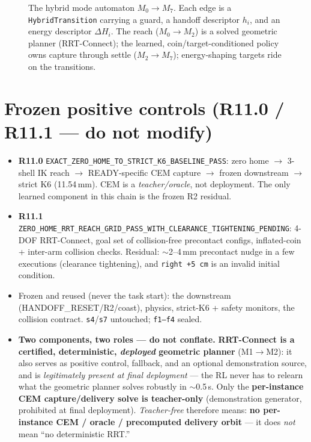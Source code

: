 \documentclass[11pt]{article}
\newcommand{\code}[1]{\texttt{\small #1}}
\begin{document}
\begin{figure}[h]\centering\caption{The hybrid mode automaton $M_0\!\to\!M_7$. Each edge is a
\code{HybridTransition} carrying a guard, a handoff descriptor $h_i$, and an energy descriptor $\Delta H_i$. The reach
($M_0\!\to\!M_2$) is a solved geometric planner (RRT-Connect); the learned, coin/target-conditioned policy owns capture
through settle ($M_2\!\to\!M_7$); energy-shaping targets ride on the transitions.}\end{figure}

\section{Frozen positive controls (R11.0 / R11.1 --- do not modify)}
\begin{itemize}[nosep,leftmargin=1.4em]
  \item \textbf{R11.0} \code{EXACT\_ZERO\_HOME\_TO\_STRICT\_K6\_BASELINE\_PASS}: zero home $\to$ 3-shell IK reach $\to$
  READY-specific CEM capture $\to$ frozen downstream $\to$ strict K6 (11.54\,mm). CEM is a \emph{teacher/oracle}, not
  deployment. The only learned component in this chain is the frozen R2 residual.
  \item \textbf{R11.1} \code{ZERO\_HOME\_RRT\_REACH\_GRID\_PASS\_WITH\_CLEARANCE\_TIGHTENING\_PENDING}: 4-DOF RRT-Connect,
  goal set of collision-free precontact configs, inflated-coin + inter-arm collision checks. Residual: $\sim$2--4\,mm
  precontact nudge in a few executions (clearance tightening), and \code{right +5\,cm} is an invalid initial condition.
  \item Frozen and reused (never the task start): the downstream (HANDOFF\_RESET/R2/coast), physics, strict-K6 + safety
  monitors, the collision contract. \code{s4}/\code{s7} untouched; \code{f1--f4} sealed.
  \item \textbf{Two components, two roles --- do not conflate.} \textbf{RRT-Connect is a certified, deterministic,
  \emph{deployed} geometric planner} (M1$\to$M2): it also serves as positive control, fallback, and an optional
  demonstration source, and is \emph{legitimately present at final deployment} --- the RL never has to relearn what the
  geometric planner solves robustly in $\sim$0.5\,s. Only the \textbf{per-instance CEM capture/delivery solve is
  teacher-only} (demonstration generator, prohibited at final deployment). \emph{Teacher-free} therefore means:
  \textbf{no per-instance CEM / oracle / precomputed delivery orbit} --- it does \emph{not} mean ``no deterministic RRT.''
\end{itemize}
\end{document}
